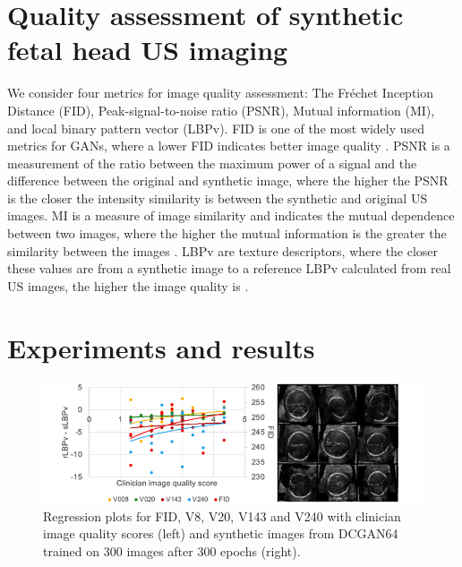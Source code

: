 \documentclass[runningheads]{llncs}
\begin{document}
\section{Quality assessment of synthetic fetal head US imaging}
We consider four metrics for image quality assessment: The Fr\'echet Inception Distance (FID), Peak-signal-to-noise ratio (PSNR), Mutual information (MI), and local binary pattern vector (LBPv). 
FID is one of the most widely used metrics for GANs, where a lower FID indicates better image quality \cite{heusel2017}.
PSNR is a measurement of the ratio between the maximum power of a signal and the difference between the original and synthetic image, where the higher the PSNR is the closer the intensity similarity is between the synthetic and original US images. 
MI is a measure of image similarity and indicates the mutual dependence between two images, where the higher the mutual information is the greater the similarity between the images \cite{wang2019}.
LBPv are texture descriptors, where the closer these values are from a synthetic image to a reference LBPv calculated from real US images, the higher the image quality is \cite{singh2018}. 

\section{Experiments and results}
\begin{figure}
\includegraphics[width=\textwidth]{fig02.png} %
\caption{Regression plots for FID, V8, V20, V143 and V240 with clinician image quality scores (left) and synthetic images from DCGAN64 trained on 300 images after 300 epochs (right).}\label{fig2}
\end{figure}
\end{document}
